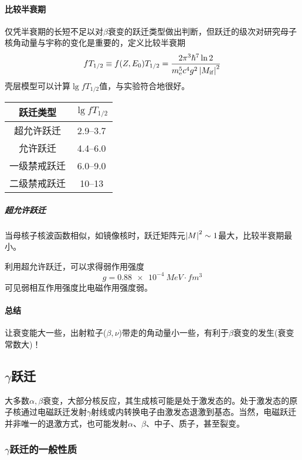 \paragraph{比较半衰期}仅凭半衰期的长短不足以对$\beta$衰变的跃迁类型做出判断，但跃迁的级次对研究母子核角动量与宇称的变化是重要的，定义比较半衰期
\begin{align}
	fT_{1/2}\equiv f(Z,E_0)T_{1/2}=\frac{2\pi^3\hbar^7\ln2}{m_\mathrm e^5c^4g^2\left\lvert M_{\mathrm{i}\mathrm{f}}\right\rvert^2}
\end{align}
壳层模型可以计算$\lg fT_{1/2}$值，与实验符合地很好。
\begin{center}
	\begin{tabular}{cc}
		\toprule
		跃迁类型&$\lg fT_{1/2}$\\
		\midrule
		超允许跃迁&\numrange{2.9}{3.7}\\
		允许跃迁&\numrange{4.4}{6.0}\\
		一级禁戒跃迁&\numrange{6.0}{9.0}\\
		二级禁戒跃迁&\numrange{10}{13}\\
		\bottomrule
	\end{tabular}
\end{center}
\subparagraph{超允许跃迁}当母核子核波函数相似，如镜像核时，跃迁矩阵元$\left\lvert M\right\rvert^2\sim 1$最大，比较半衰期最小。

利用超允许跃迁，可以求得弱作用强度
\[
	g=\SI{0.88e-4}{MeV\cdot fm^3}
\]
可见弱相互作用强度比电磁作用强度弱。
\paragraph{总结}
让衰变能大一些，出射粒子($\beta,\nu$)带走的角动量小一些，有利于$\beta$衰变的发生(衰变常数大)！
\subsection[\textit{\textgamma}跃迁]{$\gamma$跃迁}
大多数$\alpha,\beta$衰变，大部分核反应，其生成核可能是处于激发态的。处于激发态的原子核通过电磁跃迁发射$\gamma$射线或内转换电子由激发态退激到基态。当然，电磁跃迁并非唯一的退激方式，也可能发射$\alpha$、$\beta$、中子、质子，甚至裂变。
\subsubsection[\textit{\textgamma}跃迁的一般性质]{$\gamma$跃迁的一般性质}

